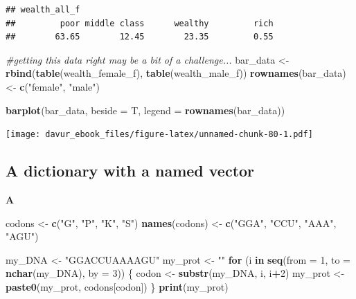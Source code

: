 \documentclass[]{book}
\newenvironment{Shaded}{\begin{snugshade}}{\end{snugshade}}
\newcommand{\CommentTok}[1]{\textcolor[rgb]{0.56,0.35,0.01}{\textit{#1}}}
\newcommand{\ControlFlowTok}[1]{\textcolor[rgb]{0.13,0.29,0.53}{\textbf{#1}}}
\newcommand{\DataTypeTok}[1]{\textcolor[rgb]{0.13,0.29,0.53}{#1}}
\newcommand{\DecValTok}[1]{\textcolor[rgb]{0.00,0.00,0.81}{#1}}
\newcommand{\KeywordTok}[1]{\textcolor[rgb]{0.13,0.29,0.53}{\textbf{#1}}}
\newcommand{\NormalTok}[1]{#1}
\newcommand{\OperatorTok}[1]{\textcolor[rgb]{0.81,0.36,0.00}{\textbf{#1}}}
\newcommand{\StringTok}[1]{\textcolor[rgb]{0.31,0.60,0.02}{#1}}
\begin{document}
\begin{verbatim}
## wealth_all_f
##         poor middle class      wealthy         rich 
##        63.65        12.45        23.35         0.55
\end{verbatim}

\begin{Shaded}
\begin{Highlighting}[]
\CommentTok{#getting this data right may be a bit of a challenge...}
\NormalTok{bar_data <-}\StringTok{ }\KeywordTok{rbind}\NormalTok{(}\KeywordTok{table}\NormalTok{(wealth_female_f), }\KeywordTok{table}\NormalTok{(wealth_male_f))}
\KeywordTok{rownames}\NormalTok{(bar_data) <-}\StringTok{ }\KeywordTok{c}\NormalTok{(}\StringTok{"female"}\NormalTok{, }\StringTok{"male"}\NormalTok{)}

\KeywordTok{barplot}\NormalTok{(bar_data, }\DataTypeTok{beside =}\NormalTok{ T, }\DataTypeTok{legend =} \KeywordTok{rownames}\NormalTok{(bar_data))}
\end{Highlighting}
\end{Shaded}

\texttt{[image: davur\_ebook\_files/figure-latex/unnamed-chunk-80-1.pdf]}

\hypertarget{a-dictionary-with-a-named-vector-1}{%
\subsection{A dictionary with a named vector}\label{a-dictionary-with-a-named-vector-1}}

\textbf{A}

\begin{Shaded}
\begin{Highlighting}[]
\NormalTok{codons <-}\StringTok{ }\KeywordTok{c}\NormalTok{(}\StringTok{"G"}\NormalTok{, }\StringTok{"P"}\NormalTok{, }\StringTok{"K"}\NormalTok{, }\StringTok{"S"}\NormalTok{)}
\KeywordTok{names}\NormalTok{(codons) <-}\StringTok{ }\KeywordTok{c}\NormalTok{(}\StringTok{"GGA"}\NormalTok{, }\StringTok{"CCU"}\NormalTok{, }\StringTok{"AAA"}\NormalTok{, }\StringTok{"AGU"}\NormalTok{)}

\NormalTok{my_DNA <-}\StringTok{ "GGACCUAAAAGU"}
\NormalTok{my_prot <-}\StringTok{ ""}
\ControlFlowTok{for}\NormalTok{ (i }\ControlFlowTok{in} \KeywordTok{seq}\NormalTok{(}\DataTypeTok{from =} \DecValTok{1}\NormalTok{, }\DataTypeTok{to =} \KeywordTok{nchar}\NormalTok{(my_DNA), }\DataTypeTok{by =} \DecValTok{3}\NormalTok{)) \{}
\NormalTok{        codon <-}\StringTok{ }\KeywordTok{substr}\NormalTok{(my_DNA, i, i}\OperatorTok{+}\DecValTok{2}\NormalTok{)}
\NormalTok{        my_prot <-}\StringTok{ }\KeywordTok{paste0}\NormalTok{(my_prot, codons[codon])}
\NormalTok{\}}
\KeywordTok{print}\NormalTok{(my_prot)}
\end{Highlighting}
\end{Shaded}
\end{document}
